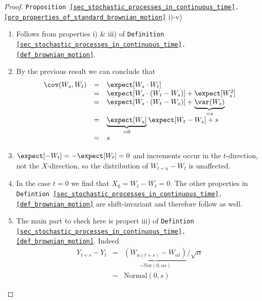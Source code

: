 \documentclass[11pt,a4paper]{article}
\begin{document}
  \begin{proof}{\texttt{Proposition \ref{sec_stochastic_processes_in_continuous_time}.\ref{pro_properties_of_standard_brownian_motion}} i)-v)}
    \begin{enumerate}
      \item Follows from properties i) \& iii) of \texttt{Definition \ref{sec_stochastic_processes_in_continuous_time}.\ref{def_brownian_motion}}.
      \item By the previous result we can conclude that
      \[\begin{array}{rcl}
        \cov(W_s,W_t)&=&\expect[W_s\cdot W_t]\\
        &=&\expect[W_s\cdot(W_t-W_s)]+\expect[W_s^2]\\
        &=&\expect[W_s\cdot(W_t-W_s)]+\underbrace{\var(W_s)}_{=s}\\
        &=&\underbrace{\expect[W_s]}_{=0}\expect[W_t-W_s]+s\\
        &=&s
      \end{array}\]
      \item $\expect[-W_t]=-\expect[W_t]=0$ and increments occur in the $t$-direction, not the $X$-direction, so the distribution of $W_{t+u}-W_t$ is unaffected.
      \item In the case $t=0$ we find that $X_0=W_t-W_t=0$. The other properties in \texttt{Defintion \ref{sec_stochastic_processes_in_continuous_time}.\ref{def_brownian_motion}} are shift-invariant and therefore follow as well.
      \item The main part to check here is propert iii) of \texttt{Defintion \ref{sec_stochastic_processes_in_continuous_time}.\ref{def_brownian_motion}}. Indeed
      \[\begin{array}{rcl}
        Y_{t+s}-Y_t&=&\underbrace{(W_{\alpha(t+s)}-W_{\alpha t})}_{\sim\text{Nor}(0,\alpha s)}/\sqrt{\alpha}\\
        &\sim&\text{Normal}(0,s)
      \end{array}\]
    \end{enumerate}
    \proved
  \end{proof}
\end{document}
